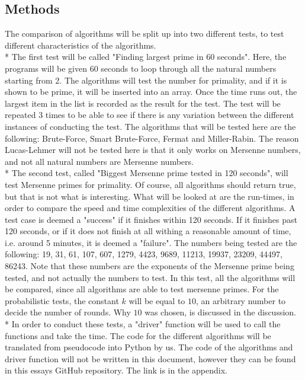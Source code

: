 \documentclass[main.tex]{subfiles}
\begin{document}
\subsection{Methods}
The comparison of algorithms will be split up into two different tests, to test
different characteristics of the algorithms. \newline
\\*
The first test will be called "Finding largest prime in 60 seconds". Here, the
programs will be given 60 seconds to loop through all the natural numbers
starting from $2$. The algorithms will test the number for primality, and if it
is shown to be prime, it will be inserted into an array. Once the time runs out,
the largest item in the list is recorded as the result for the test. The test
will be repeated 3 times to be able to see if there is any variation between the
different instances of conducting the test. The algorithms that will be tested
here are the following: Brute-Force, Smart Brute-Force, Fermat and Miller-Rabin.
The reason Lucas-Lehmer will not be tested here is that it only works on
Mersenne numbers, and not all natural numbers are Mersenne numbers. \newline
\\*
The second test, called "Biggest Mersenne prime tested in 120 seconds", will
test Mersenne primes for primality. Of course, all algorithms should return
true, but that is not what is interesting. What will be looked at are the
run-times, in order to compare the speed and time complexities of the different
algorithms. A test case is deemed a "success" if it finishes within 120 seconds.
If it finishes past 120 seconds, or if it does not finish at all withing a
reasonable amount of time, i.e. around 5 minutes, it is deemed a "failure". The
numbers being tested are the following: 19, 31, 61, 107, 607, 1279, 4423, 9689,
11213, 19937, 23209, 44497, 86243. Note that these numbers are the exponents of
the Mersenne prime being tested, and not actually the numbers to test. In this
test, all the algorithms will be compared, since all algorithms are able to test
mersenne primes. For the probabilistic tests, the constant $k$ will be equal to
$10$, an arbitrary number to decide the number of rounds. Why $10$ was chosen,
is discussed in the discussion. \newline
\\*
In order to conduct these tests, a "driver" function will be used to call the
functions and take the time. The code for the different algorithms will be
translated from pseudocode into Python by us. The code of the algorithms and
driver function will not be written in this document, however they can be found
in this essays GitHub repository. The link is in the appendix.
\end{document}
